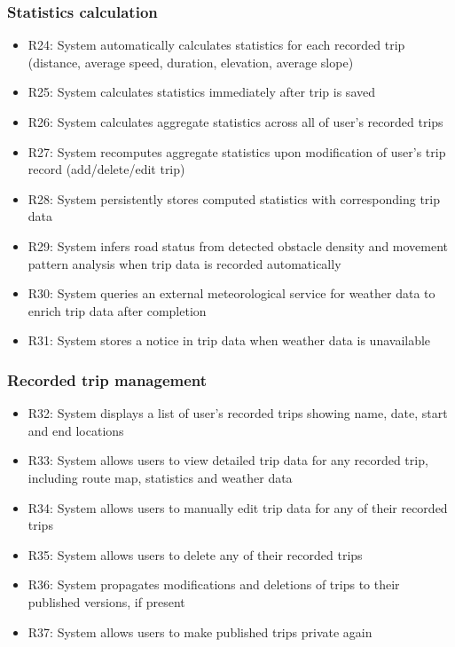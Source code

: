 \subsubsection*{Statistics calculation}
\begin{itemize}
   \item R24: System automatically calculates statistics for each recorded trip (distance, average speed, duration, elevation, average slope)
   \item R25: System calculates statistics immediately after trip is saved
   \item R26: System calculates aggregate statistics across all of user’s recorded trips
   \item R27: System recomputes aggregate statistics upon modification of user’s trip record (add/delete/edit trip)
   \item R28: System persistently stores computed statistics with corresponding trip data
   \item R29: System infers road status from detected obstacle density and movement pattern analysis when trip data is recorded automatically
   \item R30: System queries an external meteorological service for weather data to enrich trip data after completion
   \item R31: System stores a notice in trip data when weather data is unavailable
\end{itemize}

\subsubsection*{Recorded trip management}
\begin{itemize}
   \item R32: System displays a list of user’s recorded trips showing name, date, start and end locations
   \item R33: System allows users to view detailed trip data for any recorded trip, including route map, statistics and weather data
   \item R34: System allows users to manually edit trip data for any of their recorded trips
   \item R35: System allows users to delete any of their recorded trips
   \item R36: System propagates modifications and deletions of trips to their published versions, if present
   \item R37: System allows users to make published trips private again
\end{itemize}

